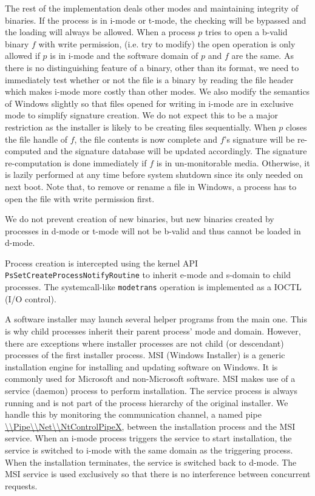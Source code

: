 The rest of the implementation deals other modes
and maintaining integrity of binaries.
If the process is in i-mode or t-mode, the checking
will be bypassed and the loading will always be allowed.
When a process $p$ tries to open a b-valid binary
$f$ with write permission, (i.e. try to modify)
the open operation is only allowed if $p$ is in i-mode
and the software domain of $p$ and $f$ are the same.
As there is no distinguishing feature of a binary, other than its format,
we need to immediately test whether or not the file is a binary
by reading the file header which  makes i-mode more costly
than other modes.
We also modify the semantics of Windows slightly so that files opened
for writing in i-mode are in exclusive mode to simplify signature creation.
We do not expect this to be a major restriction as the installer is likely
to be creating files sequentially.
When $p$ closes the file handle of $f$, the file contents is now complete
and $f$'s signature will be re-computed and the signature database will 
be updated accordingly.
The signature re-computation is done immediately if $f$ is in 
un-monitorable media.
Otherwise, it is lazily performed at any time before system shutdown since
its only needed on next boot.
Note that, to remove or rename a file in Windows, a process has to open the file
with write permission first.

We do not prevent creation of new binaries,
but new binaries created by processes in d-mode or t-mode will not
be b-valid and thus cannot be loaded in d-mode.

Process creation is intercepted using
the kernel API {\tt PsSetCreateProcessNotifyRoutine} to inherit e-mode and
s-domain to child processes.
The systemcall-like {\tt modetrans} operation
is implemented as a IOCTL (I/O control).

A software installer may launch
several helper programs from the main one.
This is why child processes inherit their parent process' mode
and domain.
However, there are exceptions where installer processes
are not child (or descendant) processes of the first installer process.
MSI (Windows Installer) is a generic installation engine
for installing and updating software on Windows.
It is commonly used for Microsoft and non-Microsoft software.
MSI makes use of a service (daemon) process to perform installation.
The service process is always running and is not part of the
process hierarchy of the original installer.
We handle this by monitoring the communication channel, 
a named pipe \url{\\Pipe\\Net\\NtControlPipeX}, between the
installation process and the MSI service.
When an i-mode process triggers the service to start installation,
the service is switched to i-mode with the same domain as the triggering
process.
When the installation terminates, the service is switched back to d-mode.
The MSI service is used exclusively so that there is no interference between
concurrent requests.
